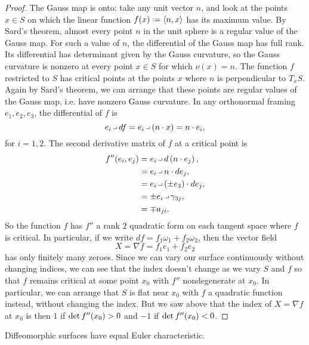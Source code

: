 \begin{proof}
The Gauss map is onto: take any unit vector \(n\), and look at the points \(x \in S\) on which the linear function \(f(x) \defeq \ip{n}{x}\) has its maximum value.
By Sard's theorem, almost every point \(n\) in the unit sphere is a regular value of the Gauss map.
For such a value of \(n\), the differential of the Gauss map has full rank.
Its differential has determinant given by the Gauss curvature, so the Gauss curvature is nonzero at every point \(x \in S\) for which \(\nu(x)=n\).
The function \(f\) restricted to \(S\) has critical points at the points \(x\) where \(n\) is perpendicular to \(T_x S\).
Again by Sard's theorem, we can arrange that these points are regular values of the Gauss map, i.e. have nonzero Gauss curvature.
In any orthonormal framing \(e_1, e_2, e_3\), the differential of \(f\) is
\[
e_i \hook df = e_i \hook \pr{n \cdot x} = n \cdot e_i,
\]
for \(i=1,2\).
The second derivative matrix of \(f\) at a critical point is
\begin{align*}
f''\of{e_i,e_j}
&=
e_i \hook d\pr{n \cdot e_j},
\\
&=
e_i \hook n \cdot de_j,
\\
&=
e_i \hook \pr{\pm e_3} \cdot de_j,
\\
&=
\pm e_i \hook \gamma_{3j},
\\
&=
\mp a_{ji}.
\end{align*}
So the function \(f\) has \(f''\) a rank \(2\) quadratic form on each tangent space where \(f\) is critical.
In particular, if we write \(df = f_1 \omega_1 + f_2 \omega_2\), then the vector field 
\[
X=\nabla f = f_1 e_1 + f_2 e_2
\]
has only finitely many zeroes.
Since we can vary our surface continuously without changing indices, we can see that the index doesn't change as we vary \(S\) and \(f\) so that \(f\) remains critical at some point \(x_0\) with \(f''\) nondegenerate at \(x_0\).
In particular, we can arrange that \(S\) is flat near \(x_0\) with \(f\) a quadratic function instead, without changing the index.
But we saw above that the index of \(X=\nabla f\) at \(x_0\) is then \(1\) if \(\det f''\!\left(x_0\right) > 0\) and \(-1\) if \(\det f''\!\left(x_0\right) < 0\).
\end{proof}
\begin{corollary}
Diffeomorphic surfaces have equal Euler characteristic.
\end{corollary}

